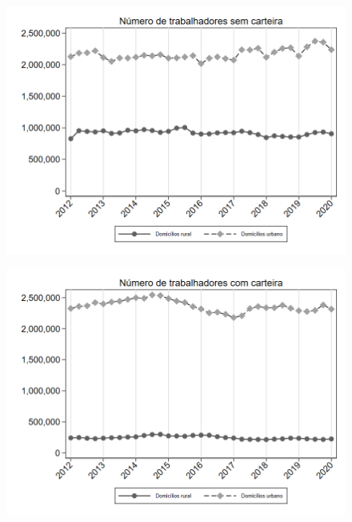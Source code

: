 \begin{frame}[label=_composicao_demografica_rural_urbano_n_empregadoSC]{}
\textit{\hyperlink{_composicao_demografica_rural_urbano}{}}
\begin{figure}
  \centering
  \includegraphics[width=1.0\linewidth]{../../analysis/output/composicao_demografica/area_geografica/_composicao_demografica_rural_urbano_n_empregadoSC.png}
  \caption{}
  \label{fig:_composicao_demografica_rural_urbano_n_empregadoSC}
\end{figure}
\end{frame}

\begin{frame}[label=_composicao_demografica_rural_urbano_n_empregadoCC]{}
\textit{\hyperlink{_composicao_demografica_rural_urbano}{}}
\begin{figure}
  \centering
  \includegraphics[width=1.0\linewidth]{../../analysis/output/composicao_demografica/area_geografica/_composicao_demografica_rural_urbano_n_empregadoCC.png}
  \caption{}
  \label{fig:_composicao_demografica_rural_urbano_n_empregadoCC}
\end{figure}
\end{frame}

